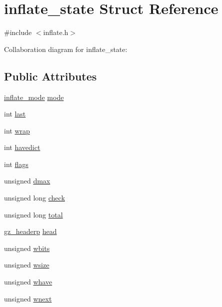 \hypertarget{structinflate__state}{}\section{inflate\+\_\+state Struct Reference}
\label{structinflate__state}


{\ttfamily \#include $<$inflate.\+h$>$}



Collaboration diagram for inflate\+\_\+state\+:
\subsection*{Public Attributes}
\begin{DoxyCompactItemize}
\item 
\hyperlink{inflate_8h_a164ea0159d5f0b5f12a646f25f99ecea}{inflate\+\_\+mode} \hyperlink{structinflate__state_a9c7906fee7eeeb450b13576531ca639d}{mode}
\item 
int \hyperlink{structinflate__state_ab3cbcd2c5ff3b0b8b34ef402a13afdf7}{last}
\item 
int \hyperlink{structinflate__state_a990d157b5c0d4ba178c3361de9ce6561}{wrap}
\item 
int \hyperlink{structinflate__state_a2eb1cd634ed6baade952ffa5938ebcdc}{havedict}
\item 
int \hyperlink{structinflate__state_a9dcf6151443750d75b2283d0a3e62c39}{flags}
\item 
unsigned \hyperlink{structinflate__state_ae3d433011714e673b22e82156acc4416}{dmax}
\item 
unsigned long \hyperlink{structinflate__state_ae597e4f5c37b9f7881015384bf826371}{check}
\item 
unsigned long \hyperlink{structinflate__state_af9d1071eb75b1ee37a151ccec8dfee95}{total}
\item 
\hyperlink{zlib_8h_a40e9dcc294796d99b25e98fb06477fc8}{gz\+\_\+headerp} \hyperlink{structinflate__state_aac35b33a559009eb4bc0e2bdd8e9b5c6}{head}
\item 
unsigned \hyperlink{structinflate__state_a71f844b589ac450f17d69f3692a8c5cc}{wbits}
\item 
unsigned \hyperlink{structinflate__state_acca16ca86216760eaf307bf71e15e470}{wsize}
\item 
unsigned \hyperlink{structinflate__state_a6b56aabe80412784eadc1068981c9d00}{whave}
\item 
unsigned \hyperlink{structinflate__state_a1c3ec583646b68713e5c92151064a6dd}{wnext}

\end{DoxyCompactItemize}
